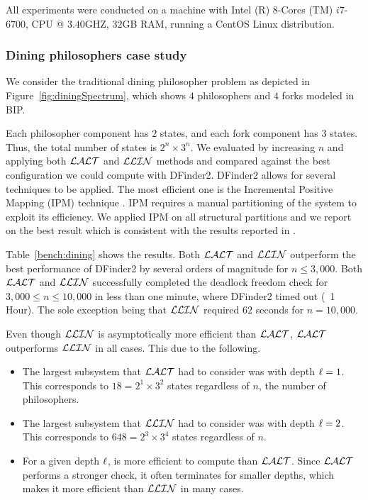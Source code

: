 All experiments were conducted on a machine with Intel (R) $8$-Cores (TM) $i7$-$6700$, CPU @ $3.40$GHZ, $32$GB RAM, 
running a CentOS Linux distribution. 

\subsubsection{Dining philosophers case study} 
We consider the traditional dining philosopher problem as depicted in 
Figure~\ref{fig:diningSpectrum}, which shows $4$ philosophers and $4$ forks modeled in BIP. 

Each philosopher component has $2$ states, and each fork component has $3$ states. 
Thus, the total number of states is $2^n \times 3^n$. 
We evaluated \deadlocktool{} by increasing $n$ and applying both $\mathcal{LALT}$ and $\mathcal{LLIN}$ methods and compared against the best configuration 
we could compute with DFinder2. 
DFinder2 allows for several techniques to be applied. The most efficient one is 
the Incremental Positive Mapping (IPM) technique \cite{DFinder2}. 
IPM requires a manual partitioning of the system to exploit its efficiency. 
We applied IPM on all structural partitions and we report on the best result which is consistent 
with the results reported in . 

Table~\ref{bench:dining} shows the results. Both $\mathcal{LALT}$ and $\mathcal{LLIN}$ outperform the best performance of DFinder2 by several orders of magnitude 
for $n\leq 3,000$. Both $\mathcal{LALT}$ and $\mathcal{LLIN}$ successfully completed the deadlock freedom check for $3,000 \leq n \leq 10,000$ 
in less than one minute, where DFinder2 timed out (~1 Hour). The sole exception being that
$\mathcal{LLIN}$ required $62$ seconds for $n=10,000$. 


Even though $\mathcal{LLIN}$ is asymptotically more efficient than $\mathcal{LALT}$,
$\mathcal{LALT}$ outperforms $\mathcal{LLIN}$ in all cases. This due to the following. 

\begin{itemize}
\item The largest subsystem that $\mathcal{LALT}$ had to consider was with depth $\ell=1$. This corresponds to $18 = 2^1\times 3^2$ states regardless of $n$, the number of philosophers. 
\item The largest subsystem that $\mathcal{LLIN}$ had to consider was with depth $\ell=2$. This corresponds to $648 = 2^3 \times 3^4$ states regardless of $n$. 
\item For a given depth $\ell$, \LLin is more efficient to compute than $\mathcal{LALT}$. 
 Since $\mathcal{LALT}$ performs a stronger check, it often terminates for smaller depths, which makes it
 more efficient than $\mathcal{LLIN}$ in many cases.
\end{itemize}


